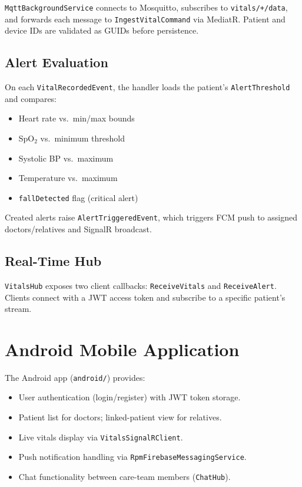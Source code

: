\documentclass[12pt,a4paper]{report}
\begin{document}
\texttt{MqttBackgroundService} connects to Mosquitto, subscribes to \texttt{vitals/+/data}, and forwards each message to \texttt{IngestVitalCommand} via MediatR. Patient and device IDs are validated as GUIDs before persistence.

\subsection{Alert Evaluation}

On each \texttt{VitalRecordedEvent}, the handler loads the patient's \texttt{AlertThreshold} and compares:

\begin{itemize}[leftmargin=*]
  \item Heart rate vs.\ min/max bounds
  \item SpO$_2$ vs.\ minimum threshold
  \item Systolic BP vs.\ maximum
  \item Temperature vs.\ maximum
  \item \texttt{fallDetected} flag (critical alert)
\end{itemize}

Created alerts raise \texttt{AlertTriggeredEvent}, which triggers FCM push to assigned doctors/relatives and SignalR broadcast.

\subsection{Real-Time Hub}

\texttt{VitalsHub} exposes two client callbacks: \texttt{ReceiveVitals} and \texttt{ReceiveAlert}. Clients connect with a JWT access token and subscribe to a specific patient's stream.

\section{Android Mobile Application}

The Android app (\texttt{android/}) provides:

\begin{itemize}[leftmargin=*]
  \item User authentication (login/register) with JWT token storage.
  \item Patient list for doctors; linked-patient view for relatives.
  \item Live vitals display via \texttt{VitalsSignalRClient}.
  \item Push notification handling via \texttt{RpmFirebaseMessagingService}.
  \item Chat functionality between care-team members (\texttt{ChatHub}).
\end{itemize}
\end{document}
